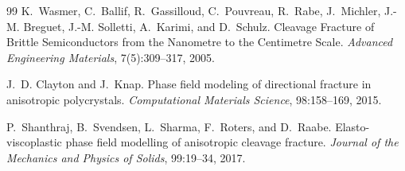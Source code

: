 \documentclass[11pt]{article}
\begin{document}
\begin{thebibliography}{99}
K.~Wasmer, C.~Ballif, R.~Gassilloud, C.~Pouvreau, R.~Rabe, J.~Michler, J.-M. Breguet, J.-M. Solletti, A.~Karimi, and D.~Schulz.
\newblock Cleavage Fracture of Brittle Semiconductors from the Nanometre to the Centimetre Scale.
\newblock \emph{Advanced Engineering Materials}, 7(5):309--317, 2005.

J.~D. Clayton and J.~Knap.
\newblock Phase field modeling of directional fracture in anisotropic polycrystals.
\newblock \emph{Computational Materials Science}, 98:158--169, 2015.

P.~Shanthraj, B.~Svendsen, L.~Sharma, F.~Roters, and D.~Raabe.
\newblock Elasto-viscoplastic phase field modelling of anisotropic cleavage fracture.
\newblock \emph{Journal of the Mechanics and Physics of Solids}, 99:19--34, 2017.




\end{thebibliography}
\end{document}
